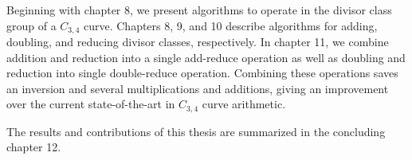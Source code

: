 Beginning with chapter 8, we present algorithms to operate in the divisor class group of a $C_{3,4}$ curve.
Chapters 8, 9, and 10 describe algorithms for adding, doubling, and reducing divisor classes, respectively.
In chapter 11, we combine addition and reduction into a single add-reduce operation
as well as doubling and reduction into single double-reduce operation.
Combining these operations saves an inversion and several multiplications and additions,
giving an improvement over the current state-of-the-art in $C_{3,4}$ curve arithmetic.

The results and contributions of this thesis are summarized in the concluding chapter 12.

